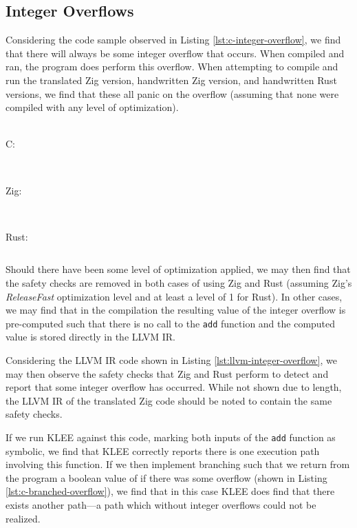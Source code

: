 \documentclass[conference]{IEEEtran}
\newenvironment{code}{\captionsetup{type=listing}}{}
\begin{document}
\subsection{Integer Overflows}
Considering the code sample observed in Listing \ref{lst:c-integer-overflow}, we find
that there will always be some integer overflow that occurs. When compiled and ran, the
program does perform this overflow. When attempting to compile and run the translated
Zig version, handwritten Zig version, and handwritten Rust versions, we find that these
all panic on the overflow (assuming that none were compiled with any level of
optimization).

\begin{code}
    \medskip
    \hrulefill\\
    C:
    \inputminted[firstline=6,lastline=19]{llvm}{../code-examples/c/integer-overflow.ll}
    \hrulefill\\
    Zig:
    \inputminted[firstline=148697,lastline=148718]{llvm}{../code-examples/zig/integer_overflow.ll}
    \hrulefill\\
    Rust:
    \inputminted[firstline=129,lastline=145]{llvm}{../code-examples/rust/integer_overflow.ll}
    \label{lst:llvm-integer-overflow}
    \medskip
\end{code}

Should there have been some level of optimization applied, we may then find
that the safety checks are removed in both cases of using Zig and Rust
(assuming Zig's \textit{ReleaseFast} optimization level and at least a level
of 1 for Rust). In other cases, we may find that in the compilation the
resulting value of the integer overflow is pre-computed such that there is
no call to the \texttt{add} function and the computed value is stored
directly in the LLVM IR.

Considering the LLVM IR code shown in Listing \ref{lst:llvm-integer-overflow}, we may
then observe the safety checks that Zig and Rust perform to detect and report that some
integer overflow has occurred. While not shown due to length, the LLVM IR of the translated
Zig code should be noted to contain the same safety checks.

If we run KLEE against this code, marking both inputs of the \texttt{add} function as symbolic,
we find that KLEE correctly reports there is one execution path involving this function. If we
then implement branching such that we return from the program a boolean value of if there was
some overflow (shown in Listing \ref{lst:c-branched-overflow}), we find that in this case KLEE
does find that there exists another path---a path which without integer overflows could not be
realized.
\end{document}
